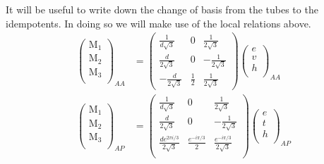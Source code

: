 \documentclass[12pt,a4paper]{article}
\begin{document}
It will be useful to write down the change of basis from the tubes to the idempotents.
In doing so we will make use of the local relations above.
\begin{align}
\label{VAA}
\left( \begin{matrix}
\text{M}_1\\
\text{M}_2\\
\text{M}_3\\
\end{matrix} \right)_{AA} 
&= \left( \begin{matrix}
\frac{1}{d\sqrt{3}} & 0 & \frac{1}{2 \sqrt{3}} \\
\frac{d}{2 \sqrt{3}} & 0 & - \frac{1}{2 \sqrt{3}} \\
- \frac{d}{2 \sqrt{3}} & \frac{1}{2} & \frac{1}{2 \sqrt{3}}
\end{matrix} \right)
\left( \begin{matrix}
e\\
v\\
h\\
\end{matrix} \right)_{AA}\\
\label{VAP}
\left( \begin{matrix}
\text{M}_1\\
\text{M}_2\\
\text{M}_3\\
\end{matrix} \right)_{AP}
&= \left( \begin{matrix}
\frac{1}{d\sqrt{3}} & 0 & \frac{1}{2 \sqrt{3}} \\
\frac{d}{2 \sqrt{3}} & 0 & - \frac{1}{2 \sqrt{3}} \\
\frac{d e^{2 \pi i/3}}{2 \sqrt{3}} & \frac{e^{- i \pi /3}}{2} & \frac{e^{- i \pi /3}}{2 \sqrt{3}}\\
\end{matrix} \right)
\left( \begin{matrix}
e\\
t\\
h\\
\end{matrix} \right)_{AP} \\

\end{align}
\end{document}
